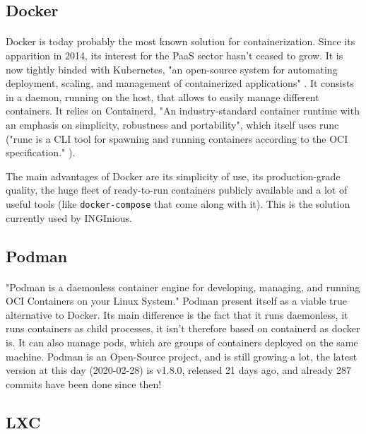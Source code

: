 \subsection{Docker}
\paragraph{}Docker\cite{merkel2014docker} is today probably the most known solution for containerization.  Since its apparition in 2014, its interest for the PaaS sector hasn't ceased to grow.  It is now tightly binded with Kubernetes, "an open-source system for automating deployment, scaling, and management of containerized applications" \cite{kubernetes}.  It consists in a daemon, running on the host, that allows to easily manage different containers.  It relies on Containerd, "An industry-standard container runtime with an emphasis on simplicity, robustness and portability"\cite{containerd}, which itself uses runc ("runc is a CLI tool for spawning and running containers according to the OCI specification." \cite{runc}).

The main advantages of Docker are its simplicity of use, its production-grade quality, the huge fleet of ready-to-run containers publicly available and a lot of useful tools (like \texttt{docker-compose} that come along with it).  This is the solution currently used by INGInious.

\subsection{Podman}
\paragraph{}"Podman is a daemonless container engine for developing, managing, and running OCI Containers on your Linux System."\cite{podman}  Podman present itself as a viable true alternative to Docker.  Its main difference is the fact that it runs daemonless, it runs containers as child processes, it isn't therefore based on containerd as docker is.  It can also manage pods, which are groups of containers deployed on the same machine.  Podman is an Open-Source project, and is still growing a lot, the latest version at this day (2020-02-28) is v1.8.0, released 21 days ago, and already 287 commits have been done since then!

\subsection{LXC}
